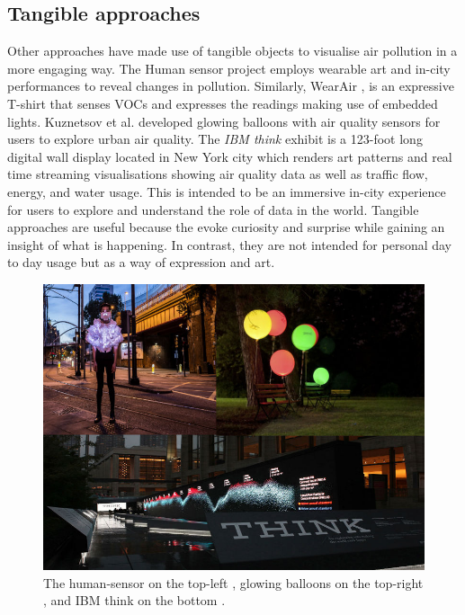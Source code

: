 \subsection{Tangible approaches}
Other approaches have made use of tangible objects to visualise air pollution in a more engaging way. The Human sensor project \cite{InvisibleDust2016} employs wearable art and in-city performances to reveal changes in pollution. Similarly, WearAir \cite{Kim2010}, is an expressive T-shirt that senses VOCs and expresses the readings making use of embedded lights. Kuznetsov et al. \cite{Kuznetsov2011} developed glowing balloons with air quality sensors for users to explore urban air quality. The \textit{IBM think} exhibit \cite{IBM2012} is a 123-foot long digital wall display located in New York city which renders art patterns and real time streaming visualisations showing air quality data as well as traffic flow, energy, and water usage. This is intended to be an immersive in-city experience for users to explore and understand the role of data in the world. Tangible approaches are useful because the evoke curiosity and surprise while gaining an insight of what is happening. In contrast, they are not intended for personal day to day usage but as a way of expression and art. 

\begin{figure}[H]
\begin{adjustbox}{width=.8\textwidth,center=\textwidth}
  \centering
  \includegraphics[scale=.4]{images/think_human_sensor_balloons.jpg}
\end{adjustbox}
  \caption[Tangible visualizations]{The human-sensor on the top-left \cite{InvisibleDust2016}, glowing balloons on the top-right \cite{Kuznetsov2011}, and IBM think on the bottom \cite{IBM2012}.}
  \label{fig:photo_based_instaNO2}
\end{figure}


